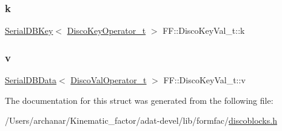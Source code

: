 \subsubsection{\texorpdfstring{k}{k}}
{\footnotesize\ttfamily \mbox{\hyperlink{classADATIO_1_1SerialDBKey}{Serial\+D\+B\+Key}}$<$ \mbox{\hyperlink{structFF_1_1DiscoKeyOperator__t}{Disco\+Key\+Operator\+\_\+t}} $>$ F\+F\+::\+Disco\+Key\+Val\+\_\+t\+::k}

\mbox{\label{structFF_1_1DiscoKeyVal__t_ae0d9c7724d26fd2b0c5118b65651b443}} 
\subsubsection{\texorpdfstring{v}{v}}
{\footnotesize\ttfamily \mbox{\hyperlink{classADATIO_1_1SerialDBData}{Serial\+D\+B\+Data}}$<$ \mbox{\hyperlink{classFF_1_1DiscoValOperator__t}{Disco\+Val\+Operator\+\_\+t}} $>$ F\+F\+::\+Disco\+Key\+Val\+\_\+t\+::v}



The documentation for this struct was generated from the following file\+:\begin{DoxyCompactItemize}
\item 
/\+Users/archanar/\+Kinematic\+\_\+factor/adat-\/devel/lib/formfac/\mbox{\hyperlink{adat-devel_2lib_2formfac_2discoblocks_8h}{discoblocks.\+h}}\end{DoxyCompactItemize}
